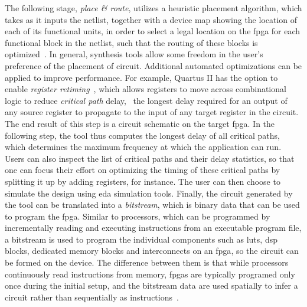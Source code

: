 The following stage, \emph{place \& route}, utilizes a heuristic placement
algorithm, which takes as it inputs the netlist, together with a device map
showing the location of each of its functional units, in order to select a
legal location on the \gls{fpga} for each functional block in the netlist,
such that the routing of these blocks is optimized~\cite{betz08}.  In general,
synthesis tools allow some freedom in the user's preference of the placement
of circuit.  Additional automated optimizations can be applied to improve
performance.  For example, Quartus II has the option to enable \emph{register
retiming}~\cite{quartus}, which allows registers to move across combinational
logic to reduce \emph{critical path} delay, \ie~the longest delay required
for an output of any source register to propagate to the input of any target
register in the circuit.  The end result of this step is a circuit schematic
on the target \gls{fpga}\@.  In the following step, the tool thus computes the
longest delay of all critical paths, which determines the maximum frequency at
which the application can run.  Users can also inspect the list of critical
paths and their delay statistics, so that one can focus their effort on
optimizing the timing of these critical paths by splitting it up by adding
registers, for instance.  The user can then choose to simulate the design using
\gls{eda} simulation tools.  Finally, the circuit generated by the tool can
be translated into a \emph{bitstream}, which is binary data that can be used
to program the \gls{fpga}\@.  Similar to processors, which can be programmed
by incrementally reading and executing instructions from an executable
program file, a bitstream is used to program the individual components such
as \glspl{lut}, \gls{dsp} blocks, dedicated memory blocks and interconnects
on an \gls{fpga}, so the circuit can be formed on the device.  The difference
between them is that while processors continuously read instructions from
memory, \glspl{fpga} are typically programed only once during the initial
setup, and the bitstream data are used spatially to infer a circuit rather than
sequentially as instructions~\cite{guccione08}.
